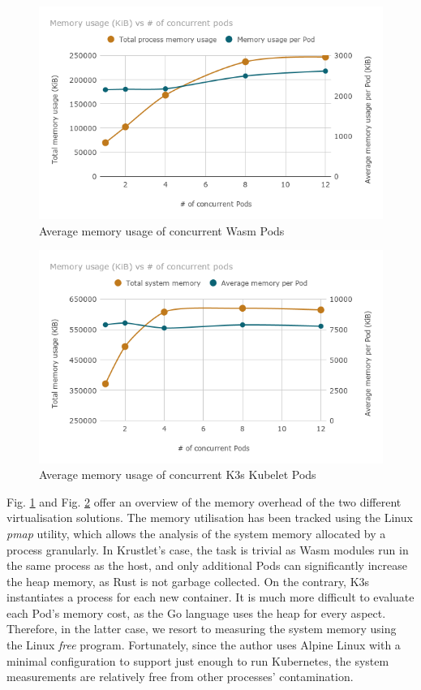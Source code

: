\begin{figure}[ht]
\centering
\includegraphics[width=\columnwidth]{figures/b-krustlet-2}
\caption{Average memory usage of concurrent Wasm Pods \label{fig:b-krustlet-2}}
\end{figure}

\begin{figure}[ht]
\centering
\includegraphics[width=\columnwidth]{figures/b-krustlet-3}
\caption{Average memory usage of concurrent K3s Kubelet Pods \label{fig:b-krustlet-3}}
\end{figure}

Fig. \ref{fig:b-krustlet-2} and Fig. \ref{fig:b-krustlet-3} offer an overview of the memory overhead of the two different virtualisation solutions. The memory utilisation has been tracked using the Linux \emph{pmap} utility, which allows the analysis of the system memory allocated by a process granularly. In Krustlet's case, the task is trivial as Wasm modules run in the same process as the host, and only additional Pods can significantly increase the heap memory, as Rust is not garbage collected. On the contrary, K3s instantiates a process for each new container. It is much more difficult to evaluate each Pod's memory cost, as the Go language uses the heap for every aspect. Therefore, in the latter case, we resort to measuring the system memory using the Linux \emph{free} program. Fortunately, since the author uses Alpine Linux with a minimal configuration to support just enough to run Kubernetes, the system measurements are relatively free from other processes' contamination.

